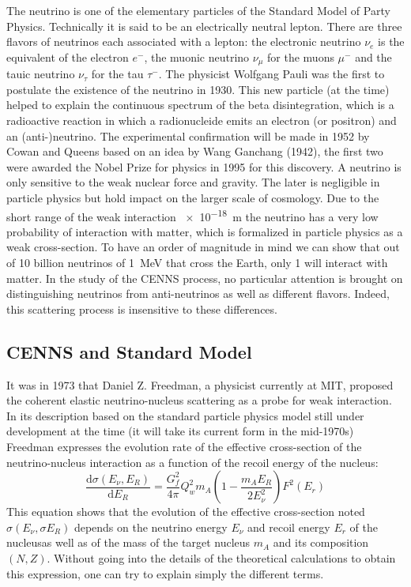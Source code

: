 The neutrino is one of the elementary particles of the Standard Model of Party Physics. Technically it is said to be an electrically neutral lepton. There are three flavors of neutrinos each associated with a lepton: the electronic neutrino $\nu_e$ is the equivalent of the electron $e^-$, the muonic neutrino $\nu_{\mu}$ for the muons $\mu^-$ and the tauic neutrino $\nu_{\tau}$ for the tau $\tau^-$.
The physicist Wolfgang Pauli was the first to postulate the existence of the neutrino in 1930. This new particle (at the time) helped to explain the continuous spectrum of the beta disintegration, which is a radioactive reaction in which a radionucleide emits an electron (or positron) and an (anti-)neutrino.
The experimental confirmation will be made in 1952 by Cowan and Queens based on an idea by Wang Ganchang (1942), the first two were awarded the Nobel Prize for physics in 1995 for this discovery.
A neutrino is only sensitive to the weak nuclear force and gravity. The later is negligible in particle physics but hold impact on the larger scale of cosmology. Due to the short range of the weak interaction \SI{e-18}{\m} the neutrino has a very low probability of interaction with matter, which is formalized in particle physics as a weak cross-section. To have an order of magnitude in mind we can show that out of 10 billion neutrinos of \SI{1}{\mega\eV} that cross the Earth, only 1 will interact with matter.
In the study of the CENNS process, no particular attention is brought on distinguishing  neutrinos from anti-neutrinos as well as different flavors. Indeed, this scattering process is insensitive to these differences. 


\subsection{CENNS and Standard Model}

It was in 1973 that Daniel Z. Freedman, a physicist currently at MIT, proposed the coherent elastic neutrino-nucleus scattering as a probe for weak interaction.
 In its description based on the standard particle physics model still under development at the time (it will take its current form in the mid-1970s) Freedman expresses the evolution rate of the effective cross-section of the neutrino-nucleus interaction as a function of the recoil energy of the nucleus:
\begin{equation}
\label{eq:cenns-equation}
\frac{\mathrm{d} \sigma (E_{\nu}, E_R)}{\mathrm{d} E_R}
=
\frac{G_{f}^2}{4\pi}
Q_w^2  m_A
\left( 1 - \frac{m_A E_R}{2 E_{\nu}^2} \right)
F^2(E_r)
\end{equation}
This equation shows that the evolution of the effective cross-section noted $\sigma(E_{\nu} , \sigma{E_R} )$ depends on the neutrino energy $E_{\nu}$ and recoil energy $E_r$ of the nucleusas well as of the mass of the target nucleus $m_A$ and its composition $(N ,Z)$. Without going into the details of the theoretical calculations to obtain this expression, one can try to explain simply the different terms.

